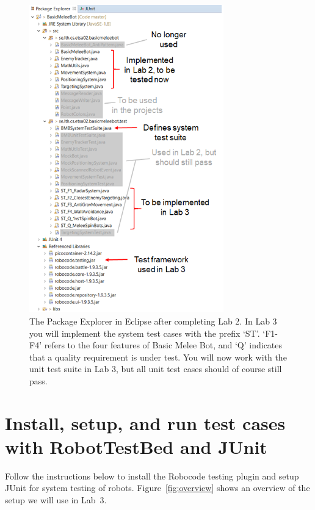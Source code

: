 \documentclass{scrreprt}
\begin{document}
\begin{figure}
\centering
\includegraphics[width=0.75\textwidth]{figures/packageExplorerAfterLab2.png}
\caption{The Package Explorer in Eclipse after completing Lab 2. In Lab 3 you will implement the system test cases with the prefix `ST'. `F1-F4' refers to the four features of Basic Melee Bot, and `Q' indicates that a quality requirement is under test. You will now work with the unit test suite in Lab 3, but all unit test cases should of course still pass.}
\label{fig:packageExplorer}
\end{figure}

\section{Install, setup, and run test cases with RobotTestBed and JUnit}
Follow the instructions below to install the Robocode testing plugin and setup JUnit for system testing of robots. Figure~\ref{fig:overview} shows an overview of the setup we will use in Lab~3.
\end{document}
